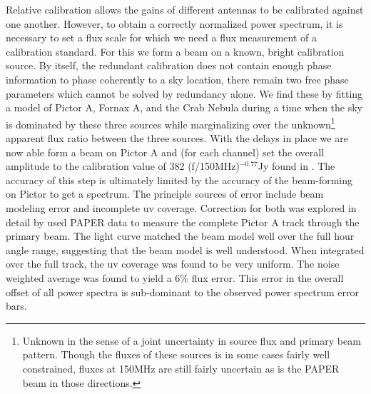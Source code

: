 \documentclass[preprint2]{aastex}
\begin{document}
Relative calibration allows the gains of different antennas to be calibrated against one another.  However, to obtain a correctly normalized power spectrum, it is necessary to set a flux scale for which we need a flux measurement of a calibration standard.  For this we form a beam on a known, bright calibration source.  By itself, the redundant calibration does not contain enough phase information to phase coherently to a sky location, there remain two free phase parameters which cannot be solved by redundancy alone.   We find these by fitting a model of Pictor A, Fornax A, and the Crab Nebula during a time when the sky is dominated by these three sources while marginalizing over the unknown\footnote{Unknown in the sense of a joint uncertainty in source flux and primary beam pattern. Though the fluxes of these sources is in some cases fairly well constrained, fluxes at 150MHz are still fairly uncertain as is the PAPER beam in those directions.} apparent flux ratio between the three sources. With the delays in place we are now able form a beam on Pictor A and (for each channel) set the overall amplitude to the calibration value of 382 (f/150MHz)$^{-0.77}$Jy found in \cite{jacobs:2013b}.  The accuracy of this step is ultimately limited by the accuracy of the beam-forming on Pictor to get a spectrum.  The principle sources of error include beam modeling error and incomplete uv coverage. Correction for both was explored in detail by \citet{jacobs:2013b} used PAPER data to measure the complete Pictor A track through the primary beam. The light curve matched the beam model well over the full hour angle range, suggesting that the beam model is well understood. When integrated over the full track, the uv coverage was found to be very uniform. The noise weighted average was found to yield a 6\% flux error.  This error in the overall offset of all power spectra is sub-dominant to the observed power spectrum error bars.
  
\end{document}

